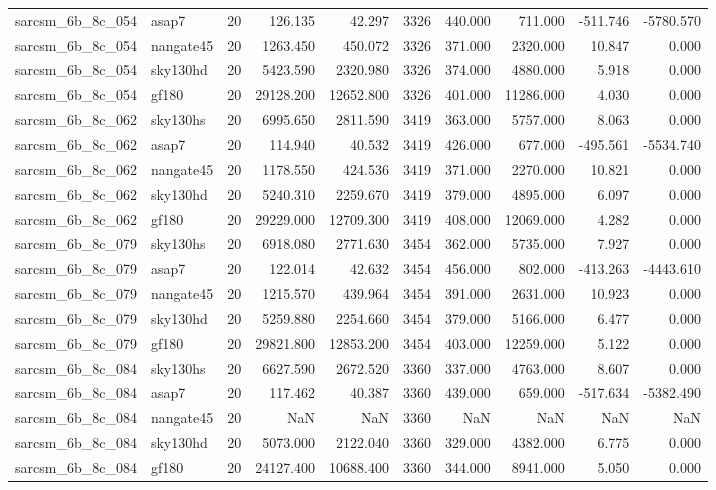 \documentclass{article}
\begin{document}
\begin{longtable}{llrrrrrrrr}
sarcsm\_6b\_8c\_054 & asap7 & 20 & 126.135 & 42.297 & 3326 & 440.000 & 711.000 & -511.746 & -5780.570 \\
sarcsm\_6b\_8c\_054 & nangate45 & 20 & 1263.450 & 450.072 & 3326 & 371.000 & 2320.000 & 10.847 & 0.000 \\
sarcsm\_6b\_8c\_054 & sky130hd & 20 & 5423.590 & 2320.980 & 3326 & 374.000 & 4880.000 & 5.918 & 0.000 \\
sarcsm\_6b\_8c\_054 & gf180 & 20 & 29128.200 & 12652.800 & 3326 & 401.000 & 11286.000 & 4.030 & 0.000 \\
sarcsm\_6b\_8c\_062 & sky130hs & 20 & 6995.650 & 2811.590 & 3419 & 363.000 & 5757.000 & 8.063 & 0.000 \\
sarcsm\_6b\_8c\_062 & asap7 & 20 & 114.940 & 40.532 & 3419 & 426.000 & 677.000 & -495.561 & -5534.740 \\
sarcsm\_6b\_8c\_062 & nangate45 & 20 & 1178.550 & 424.536 & 3419 & 371.000 & 2270.000 & 10.821 & 0.000 \\
sarcsm\_6b\_8c\_062 & sky130hd & 20 & 5240.310 & 2259.670 & 3419 & 379.000 & 4895.000 & 6.097 & 0.000 \\
sarcsm\_6b\_8c\_062 & gf180 & 20 & 29229.000 & 12709.300 & 3419 & 408.000 & 12069.000 & 4.282 & 0.000 \\
sarcsm\_6b\_8c\_079 & sky130hs & 20 & 6918.080 & 2771.630 & 3454 & 362.000 & 5735.000 & 7.927 & 0.000 \\
sarcsm\_6b\_8c\_079 & asap7 & 20 & 122.014 & 42.632 & 3454 & 456.000 & 802.000 & -413.263 & -4443.610 \\
sarcsm\_6b\_8c\_079 & nangate45 & 20 & 1215.570 & 439.964 & 3454 & 391.000 & 2631.000 & 10.923 & 0.000 \\
sarcsm\_6b\_8c\_079 & sky130hd & 20 & 5259.880 & 2254.660 & 3454 & 379.000 & 5166.000 & 6.477 & 0.000 \\
sarcsm\_6b\_8c\_079 & gf180 & 20 & 29821.800 & 12853.200 & 3454 & 403.000 & 12259.000 & 5.122 & 0.000 \\
sarcsm\_6b\_8c\_084 & sky130hs & 20 & 6627.590 & 2672.520 & 3360 & 337.000 & 4763.000 & 8.607 & 0.000 \\
sarcsm\_6b\_8c\_084 & asap7 & 20 & 117.462 & 40.387 & 3360 & 439.000 & 659.000 & -517.634 & -5382.490 \\
sarcsm\_6b\_8c\_084 & nangate45 & 20 & NaN & NaN & 3360 & NaN & NaN & NaN & NaN \\
sarcsm\_6b\_8c\_084 & sky130hd & 20 & 5073.000 & 2122.040 & 3360 & 329.000 & 4382.000 & 6.775 & 0.000 \\
sarcsm\_6b\_8c\_084 & gf180 & 20 & 24127.400 & 10688.400 & 3360 & 344.000 & 8941.000 & 5.050 & 0.000 \\

\end{longtable}
\end{document}
